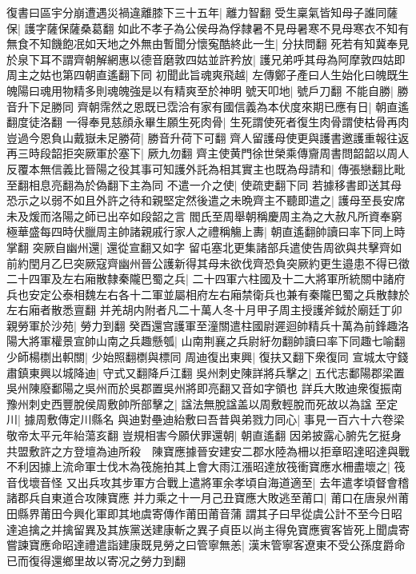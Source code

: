 復書曰區宇分崩遭遇災禍違離膝下三十五年|{
	離力智翻}
受生稟氣皆知母子誰同薩保|{
	護字薩保薩桑葛翻}
如此不孝子為公侯母為俘隸暑不見母暑寒不見母寒衣不知有無食不知饑飽冺如天地之外無由暫聞分懷寃酷終此一生|{
	分扶問翻}
死若有知冀奉見於泉下耳不謂齊朝解網惠以德音磨敦四姑並許矜放|{
	護兄弟呼其母為阿摩敦四姑即周主之姑也第四朝直遙翻下同}
初聞此旨魂爽飛越|{
	左傳鄭子產曰人生始化曰魄既生魄陽曰魂用物精多則魂魄強是以有精爽至於神明}
號天叩地|{
	號戶刀翻}
不能自勝|{
	勝音升下足勝同}
齊朝霈然之恩既已霑洽有家有國信義為本伏度來期已應有日|{
	朝直遙翻度徒洛翻}
一得奉見慈顔永畢生願生死肉骨|{
	生死謂使死者復生肉骨謂使枯骨再肉}
豈過今恩負山戴嶽未足勝荷|{
	勝音升荷下可翻}
齊人留護母使更與護書邀護重報往返再三時段韶拒突厥軍於塞下|{
	厥九勿翻}
齊主使黄門徐世榮乘傳齎周書問韶韶以周人反覆本無信義比晉陽之役其事可知護外託為相其實主也既為母請和|{
	傳張戀翻比毗至翻相息亮翻為於偽翻下主為同}
不遣一介之使|{
	使疏吏翻下同}
若據移書即送其母恐示之以弱不如且外許之待和親堅定然後遣之未晩齊主不聽即遣之|{
	護母至長安席未及煖而洛陽之師已出卒如段韶之言}
閻氏至周舉朝稱慶周主為之大赦凡所資奉窮極華盛每四時伏臘周主帥諸親戚行家人之禮稱觴上夀|{
	朝直遙翻帥讀曰率下同上時掌翻}
突厥自幽州還|{
	還從宣翻又如字}
留屯塞北更集諸部兵遣使告周欲與共擊齊如前約閏月乙巳突厥寇齊幽州晉公護新得其母未欲伐齊恐負突厥約更生邉患不得已徵二十四軍及左右廂散隸秦隴巴蜀之兵|{
	二十四軍六柱國及十二大將軍所統關中諸府兵也安定公泰相魏左右各十二軍並屬相府左右廂禁衛兵也兼有秦隴巴蜀之兵散隸於左右廂者散悉亶翻}
并羌胡内附者凡二十萬人冬十月甲子周主授護斧鉞於廟廷丁卯親勞軍於沙苑|{
	勞力到翻}
癸酉還宫護軍至潼關遣柱國尉遲迴帥精兵十萬為前鋒趣洛陽大將軍權景宣帥山南之兵趣懸瓠|{
	山南荆襄之兵尉紆勿翻帥讀曰率下同趣七喻翻}
少師楊檦出軹關|{
	少始照翻檦與標同}
周迪復出東興|{
	復扶又翻下衆復同}
宣城太守錢肅鎮東興以城降迪|{
	守式又翻降戶江翻}
吳州刺史陳詳將兵擊之|{
	五代志鄱陽郡梁置吳州陳廢鄱陽之吳州而於吳郡置吳州將即亮翻又音如字領也}
詳兵大敗迪衆復振南豫州刺史西豐脫侯周敷帥所部擊之|{
	諡法無脫諡盖以周敷輕脫而死故以為諡}
至定川|{
	據周敷傳定川縣名}
與迪對壘迪紿敷曰吾昔與弟戮力同心|{
	事見一百六十六卷梁敬帝太平元年紿蕩亥翻}
豈規相害今願伏罪還朝|{
	朝直遙翻}
因弟披露心腑先乞挺身共盟敷許之方登壇為迪所殺　陳寶應據晉安建安二郡水陸為柵以拒章昭達昭達與戰不利因據上流命軍士伐木為筏施拍其上會大雨江漲昭達放筏衝寶應水柵盡壞之|{
	筏音伐壞音怪}
又出兵攻其步軍方合戰上遣將軍余孝頃自海道適至|{
	去年遣孝頃督會稽諸郡兵自東道合攻陳寶應}
并力乘之十一月己丑寶應大敗逃至莆口|{
	莆口在唐泉州莆田縣界莆田今興化軍即其地虞寄傳作莆田莆音蒲}
謂其子曰早從虞公計不至今日昭達追擒之并擒留異及其族黨送建康斬之異子貞臣以尚主得免寶應賓客皆死上聞虞寄嘗諫寶應命昭達禮遣詣建康既見勞之曰管寧無恙|{
	漢末管寧客遼東不受公孫度爵命已而復得還鄉里故以寄况之勞力到翻}
